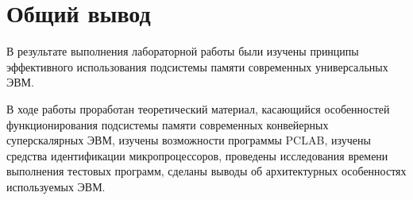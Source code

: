 \chapter*{Общий вывод}

В результате выполнения лабораторной работы были изучены принципы эффективного использования подсистемы памяти современных универсальных ЭВМ.

В ходе работы проработан теоретический материал, касающийся особенностей функционирования подсистемы памяти современных конвейерных суперскалярных ЭВМ, изучены возможности программы PCLAB, изучены средства идентификации микропроцессоров, проведены исследования времени выполнения тестовых программ, сделаны выводы об архитектурных особенностях используемых ЭВМ.

